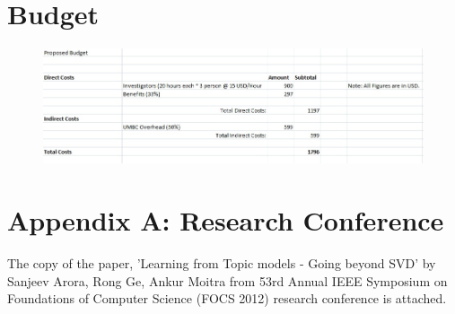 \documentclass[a4paper,11pt]{article}
\begin{document}
\section{Budget}
\begin{figure}[h]
\includegraphics[scale=0.7]{Budget.jpg}
\end{figure}



\section{Appendix A: Research Conference}
The copy of the paper, 'Learning from Topic models - Going beyond SVD' by Sanjeev Arora, Rong Ge, Ankur Moitra from 53rd Annual IEEE Symposium on Foundations of Computer Science (FOCS 2012) research conference is attached.
\end{document}
